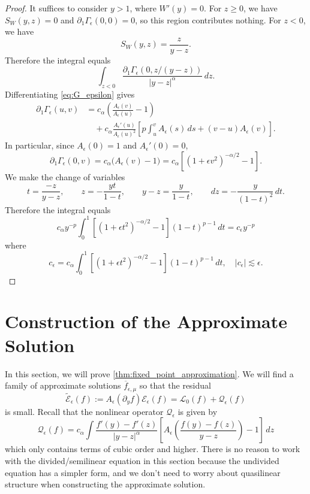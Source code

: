 \documentclass[11pt]{amsart}
\theoremstyle{definition}
\theoremstyle{remark}
\numberwithin{equation}{section}
\newcommand{\sq}[1]{\widetilde{#1}}
\newcommand{\mc}[1]{\mathcal{#1}}
\newcommand{\ov}[1]{\overline{#1}}
\begin{document}
\begin{proof}
    It suffices to consider $y>1$, where $W'(y)=0$. For $z\geq0$, we have $S_W(y,z)=0$ and $\partial_1\Gamma_\epsilon(0,0)=0$, so this region contributes nothing. For $z<0$, we have
    \[S_W(y, z) = \frac{z}{y - z}.\]
    Therefore the integral equals
    \[\int_{z < 0} \frac{\partial_1\Gamma_\epsilon(0, z / (y - z))}{|y - z|^\alpha} \, dz.\] 
    Differentiating \eqref{eq:G_epsilon} gives
    \begin{equation}\label{eqn:analysis_kernel_first_partial}
    \begin{aligned}
        \partial_1\Gamma_\epsilon(u,v)
        &=c_\alpha\left(\frac{A_\epsilon(v)}{A_\epsilon(u)}-1\right)\\
        &\quad+c_\alpha\frac{A_\epsilon'(u)}{A_\epsilon(u)^2}
        \left[p\int_u^v A_\epsilon(s)\,ds+(v-u)A_\epsilon(v)\right].
    \end{aligned}
    \end{equation}
    In particular, since $A_\epsilon(0)=1$ and $A_\epsilon'(0)=0$,
    \[
        \partial_1\Gamma_\epsilon(0,v)
        =c_\alpha\bigl(A_\epsilon(v)-1\bigr)
        =c_\alpha\left[(1+\epsilon v^2)^{-\alpha/2}-1\right].
    \]
    We make the change of variables
    \[
        t=\frac{-z}{y-z},\qquad z=-\frac{yt}{1-t},\qquad
        y-z=\frac{y}{1-t},\qquad dz=-\frac{y}{(1-t)^2}\,dt.
    \]
    Therefore the integral equals
    \[c_\alpha y^{-p}\int_0^1\left[(1+\epsilon t^2)^{-\alpha/2}-1\right](1-t)^{p-1}\,dt = c_\epsilon y^{-p}\]
    where 
    \[c_\epsilon = c_\alpha\int_0^1\left[(1+\epsilon t^2)^{-\alpha/2}-1\right](1-t)^{p-1}\,dt, \quad |c_\epsilon| \lesssim \epsilon.\]
\end{proof}

\section{Construction of the Approximate Solution}\label{sec:approximate_solution}

In this section, we will prove \cref{thm:fixed_point_approximation}. We will find a family of approximate solutions $\ov{f}_{\epsilon, \mu}$ so that the residual 
\[\sq{\mc{E}}_{\epsilon}(f) := A_\epsilon(\partial_y f) \mc{E}_\epsilon(f) = \mc{L}_0(f) + \mc{Q}_\epsilon(f)\]
is small. Recall that the nonlinear operator $\mc{Q}_\epsilon$ is given by
\[\mc{Q}_\epsilon(f) = c_\alpha \int \frac{f'(y) - f'(z)}{|y - z|^\alpha}\left[A_\epsilon\left(\frac{f(y) - f(z)}{y - z}\right) - 1\right] \, dz\]
which only contains terms of cubic order and higher. There is no reason to work with the divided/semilinear equation in this section because the undivided equation has a simpler form, and we don't need to worry about quasilinear structure when constructing the approximate solution.
\end{document}
